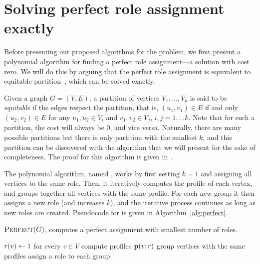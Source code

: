 \section{Solving perfect role assignment exactly}
\label{section:perfect}

Before presenting our proposed algorithms for the \prbrm problem, 
we first present a polynomial algorithm
for finding a perfect role assignment---a solution with cost zero.
We will do this by arguing that the perfect role assignment is equivalent
to equitable partition~\cite{McKay1978}, which can be solved exactly.

\iffalse
In the light of the previous \np-hardness results, this polynomial algorithm
appears somewhat surprising.  Note however, that this polynomial algorithm
guarantees to find the minimum number of roles for which there is a solution of
cost zero.  This is a different question than the one posed by the \prbrm
problem, where we aim to find a minimum-cost solution for a given number of
roles.
\fi

Given a graph $G = (V, E)$, a partition of vertices $V_1, \ldots, V_k$ is said
to be \emph{equitable} if the edges respect the partition, that is, $(u_1, v_1) \in E$ if
and only $(u_2, v_2) \in E$ for any $u_1, u_2 \in V_i$ and $v_1, v_2 \in V_j$,
$i, j = 1, \ldots k$.  Note that for such a partition, the cost will always be
0, and vice versa. Naturally, there are many possible partitions but there is only
partition with the smallest $k$, and this partition can be discovered
with the algorithm that we will present for the sake of completeness. The proof
for this algorithm is given in~\cite{McKay1978}.

The polynomial algorithm, named \algperfect, 
works by first setting $k=1$ and assigning all vertices to the same role. 
Then, it iteratively computes the profile of each vertex, 
and groups together all vertices with the same profile. 
For each new group it then assigns a new role (and increases $k$), 
and the iterative process continues as long as new roles are created. 
Pseudocode for \algperfect is given in Algorithm~\ref{alg:perfect}.

\begin{algorithm}[t]
\caption{$\textsc{Perfect}(G)$, computes a perfect assignment with smallest number of roles.}
\label{alg:perfect}
	$r(v) \leftarrow 1$ for every $v \in V$\;
	 {
		compute profiles $\prof{v; \role}$\;
		group vertices with the same profiles\;
		assign a role to each group\;
	}
\end{algorithm}

